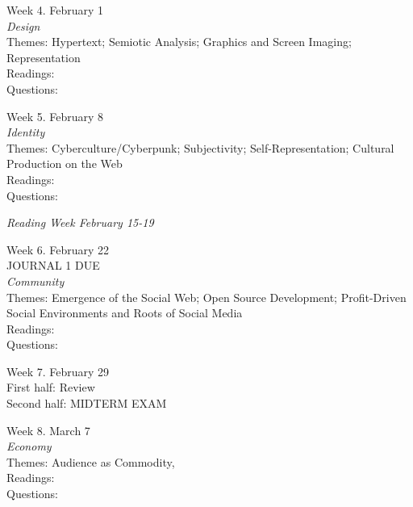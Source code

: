 \documentclass[10pt]{article}
\begin{document}
Week 4. February 1 \\
\textit{Design} \\
Themes: Hypertext; Semiotic Analysis; Graphics and Screen Imaging; Representation \\ 
Readings: \\
Questions:

Week 5. February 8 \\
\textit{Identity} \\
Themes: Cyberculture/Cyberpunk; Subjectivity; Self-Representation; Cultural Production on the Web \\ 
Readings: \\
Questions: 

\textit{Reading Week February 15-19}

Week 6. February 22 \\
JOURNAL 1 DUE \\
\textit{Community} \\
Themes: Emergence of the Social Web; Open Source Development; Profit-Driven Social Environments and Roots of Social Media \\
Readings: \\
Questions: 

Week 7. February 29 \\
First half: Review \\
Second half: MIDTERM EXAM 

Week 8. March 7 \\
\textit{Economy} \\
Themes: Audience as Commodity, \\
Readings: \\
Questions: 
\end{document}
